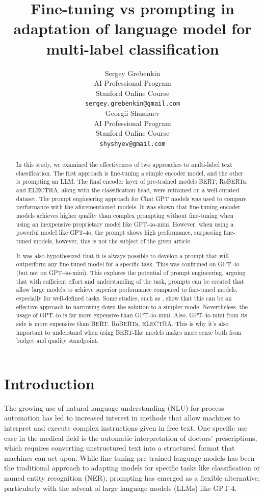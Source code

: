 \documentclass[11pt]{article}
\title{Fine-tuning vs prompting in adaptation of language model for multi-label classification}
\author{Sergey Grebenkin \\
  AI Professional Program \\
  Stanford Online Course \\
  \texttt{sergey.grebenkin@gmail.com} \\\And
  Georgii Shushuev \\
  AI Professional Program \\
  Stanford Online Course \\
  \texttt{shyshyev@gmail.com}
}
\begin{document}
\maketitle
\begin{abstract}
In this study, we examined the effectiveness of two approaches to multi-label text classification. The first approach is fine-tuning a simple encoder model, and the other is prompting an LLM. The final encoder layer of pre-trained models BERT, RoBERTa, and ELECTRA, along with the classification head, were retrained on a well-curated dataset. The prompt engineering approach for Chat GPT models was used to compare performance with the aforementioned models. It was shown that fine-tuning encoder models achieves higher quality than complex prompting without fine-tuning when using an inexpensive proprietary model like GPT-4o-mini. However, when using a powerful model like GPT-4o, the prompt shows high performance, surpassing fine-tuned models, however, this is not the subject of the given article.

It was also hypothesized that it is always possible to develop a prompt that will outperform any fine-tuned model for a specific task. This was confirmed on GPT-4o (but not on GPT-4o-mini). This explores the potential of prompt engineering, arguing that with sufficient effort and understanding of the task, prompts can be created that allow large models to achieve superior performance compared to fine-tuned models, especially for well-defined tasks. Some studies, such as \cite{huggingface}, show that this can be an effective approach to narrowing down the solution to a simpler mode. Nevertheless, the usage of GPT-4o is far more expensive than GPT-4o-mini. Also, GPT-4o-mini from its side is more expensive than BERT, RoBERTa, ELECTRA. This is why it's also important to understand when using BERT-like models makes more sense both from budget and quality standpoint.

\end{abstract}

\section{Introduction}

The growing use of natural language understanding (NLU) for process automation has led to increased interest in methods that allow machines to interpret and execute complex instructions given in free text. One specific use case in the medical field is the automatic interpretation of doctors' prescriptions, which requires converting unstructured text into a structured format that machines can act upon. While fine-tuning pre-trained language models has been the traditional approach to adapting models for specific tasks like classification or named entity recognition (NER), prompting has emerged as a flexible alternative, particularly with the advent of large language models (LLMs) like GPT-4.
\end{document}
